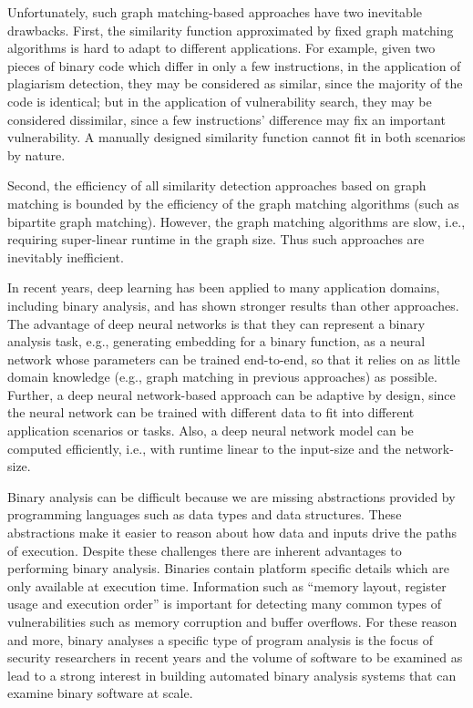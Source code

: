 Unfortunately, such graph matching-based approaches have two inevitable drawbacks. First, the similarity function approximated by fixed graph matching algorithms is hard to adapt to different
applications. For example, given two pieces of binary code which differ in only a few instructions, in the application of plagiarism detection, they may be considered as similar, since the majority of the code is identical; but in the application of vulnerability search, they may be considered dissimilar, since a few instructions’ difference may fix an important vulnerability. A manually designed similarity function cannot fit in both scenarios by nature.

Second, the efficiency of all similarity detection approaches based on graph matching is bounded by the efficiency of the graph matching algorithms (such as bipartite graph matching). However, the
graph matching algorithms are slow, i.e., requiring super-linear runtime in the graph size. Thus such approaches are inevitably inefficient.

In recent years, deep learning has been applied to many application domains, including binary analysis, and has shown stronger results than other approaches. The advantage of deep
neural networks is that they can represent a binary analysis task, e.g., generating embedding for a binary function, as a neural network whose parameters can be trained end-to-end, so that it relies
on as little domain knowledge (e.g., graph matching in previous approaches) as possible. Further, a deep neural network-based approach can be adaptive by design, since the neural network can
be trained with different data to fit into different application scenarios or tasks. Also, a deep neural network model can be computed efficiently, i.e., with runtime linear to the input-size and the network-size.


Binary analysis can be difficult because we are missing abstractions provided by programming languages such as data types and data structures. These abstractions make it easier to reason about how data and inputs drive the paths of execution. Despite these challenges there are inherent advantages to performing binary analysis. Binaries contain platform specific details which are only available at execution time. Information such as “memory layout, register usage and execution order” is important for detecting many common types of vulnerabilities such as memory corruption and buffer overflows. For these reason and more, binary analyses a specific type of program analysis is the focus of security researchers in recent years and the volume of software to be examined as lead to a strong interest in building automated binary analysis systems that can examine binary software at scale.

